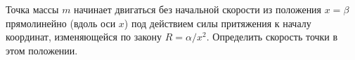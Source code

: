 Точка массы $m$ начинает двигаться без начальной скорости из положения $x=\beta$ прямолинейно (вдоль оси $x$) под
действием силы притяжения к началу координат, изменяющейся по закону $R=\alpha/x^2$.
Определить скорость точки в этом положении.
